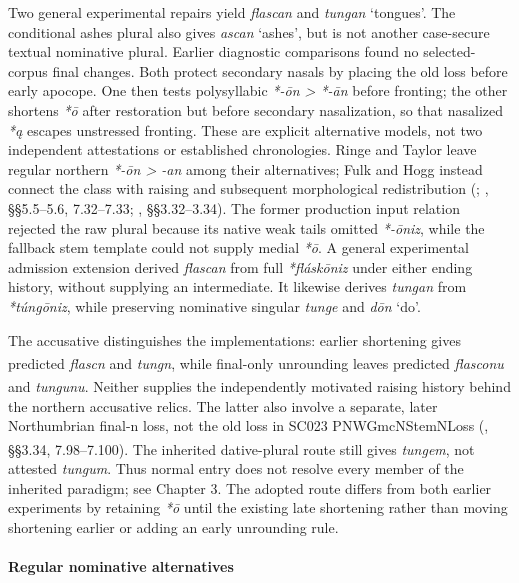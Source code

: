 \documentclass[
  british,
  a4paper,
]{article}
\providecommand{\Pred}[1]{\textsuperscript{\dag}\emph{#1}}
\begin{document}
Two general experimental repairs yield \emph{flascan} and \emph{tungan}
`tongues'. The conditional ashes plural also gives \emph{ascan} `ashes',
but is not another case-secure textual nominative plural. Earlier
diagnostic comparisons found no selected-corpus final changes. Both
protect secondary nasals by placing the old loss before early apocope.
One then tests polysyllabic \emph{*-ōn > *-ān} before fronting; the
other shortens \emph{*ō} after restoration but before secondary
nasalization, so that nasalized \emph{*ą} escapes unstressed fronting.
These are explicit alternative models, not two independent attestations
or established chronologies. Ringe and Taylor leave regular northern
\emph{*-ōn > -an} among their alternatives; Fulk and Hogg instead
connect the class with raising and subsequent morphological
redistribution (; ,
§§5.5--5.6, 7.32--7.33; , §§3.32--3.34). The former production input relation rejected
the raw plural because its native weak tails omitted \emph{*-ōniz},
while the fallback stem template could not supply medial \emph{*ō}. A
general experimental admission extension derived \emph{flascan} from
full \emph{*fláskōniz} under either ending history, without supplying an
intermediate. It likewise derives \emph{tungan} from \emph{*túngōniz},
while preserving nominative singular \emph{tunge} and \emph{dōn} `do'.

The accusative distinguishes the implementations: earlier shortening
gives predicted \Pred{flascn} and \Pred{tungn}, while final-only
unrounding leaves predicted \Pred{flasconu} and \Pred{tungunu}. Neither
supplies the independently motivated raising history behind the northern
accusative relics. The latter also involve a separate, later
Northumbrian final-n loss, not the old loss in SC023 PNWGmcNStemNLoss
(, §§3.34,
7.98--7.100). The inherited dative-plural route still gives
\Pred{tungem}, not attested \emph{tungum}. Thus normal entry does not
resolve every member of the inherited paradigm; see Chapter 3. The
adopted route differs from both earlier experiments by retaining
\emph{*ō} until the existing late shortening rather than moving
shortening earlier or adding an early unrounding rule.

\paragraph{Regular nominative
alternatives}\label{regular-nominative-alternatives}
\end{document}
